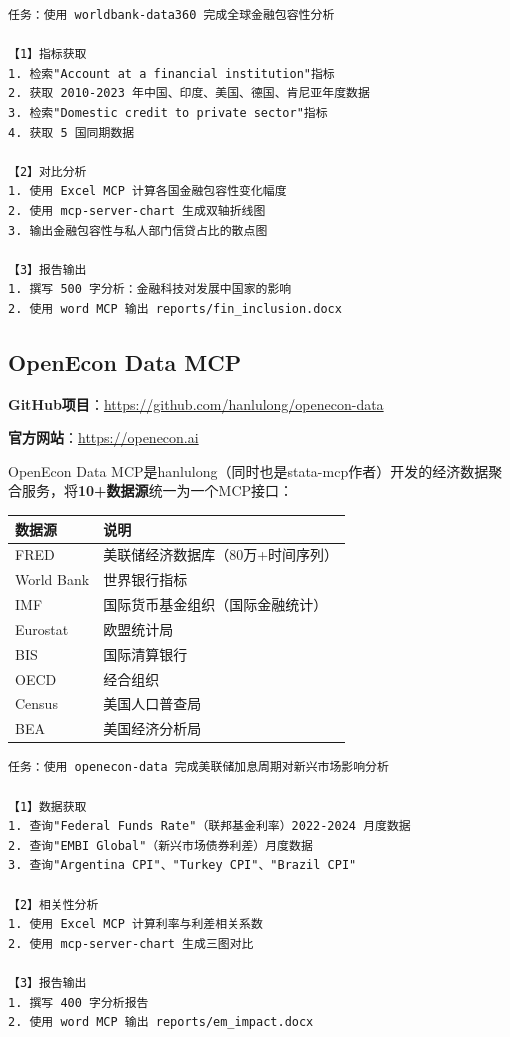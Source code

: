 \begin{lstlisting}
任务：使用 worldbank-data360 完成全球金融包容性分析

【1】指标获取
1. 检索"Account at a financial institution"指标
2. 获取 2010-2023 年中国、印度、美国、德国、肯尼亚年度数据
3. 检索"Domestic credit to private sector"指标
4. 获取 5 国同期数据

【2】对比分析
1. 使用 Excel MCP 计算各国金融包容性变化幅度
2. 使用 mcp-server-chart 生成双轴折线图
3. 输出金融包容性与私人部门信贷占比的散点图

【3】报告输出
1. 撰写 500 字分析：金融科技对发展中国家的影响
2. 使用 word MCP 输出 reports/fin_inclusion.docx
\end{lstlisting}

\subsection{OpenEcon Data MCP}

\textbf{GitHub项目}：\url{https://github.com/hanlulong/openecon-data}

\textbf{官方网站}：\url{https://openecon.ai}

OpenEcon Data MCP是hanlulong（同时也是stata-mcp作者）开发的经济数据聚合服务，将\textbf{10+数据源}统一为一个MCP接口：

\begin{table}[H]
\centering
\small
\begin{tabular}{ll}
\toprule
\textbf{数据源} & \textbf{说明} \\
\midrule
FRED & 美联储经济数据库（80万+时间序列） \\
World Bank & 世界银行指标 \\
IMF & 国际货币基金组织（国际金融统计） \\
Eurostat & 欧盟统计局 \\
BIS & 国际清算银行 \\
OECD & 经合组织 \\
Census & 美国人口普查局 \\
BEA & 美国经济分析局 \\
\bottomrule
\end{tabular}
\end{table}

\begin{lstlisting}
任务：使用 openecon-data 完成美联储加息周期对新兴市场影响分析

【1】数据获取
1. 查询"Federal Funds Rate"（联邦基金利率）2022-2024 月度数据
2. 查询"EMBI Global"（新兴市场债券利差）月度数据
3. 查询"Argentina CPI"、"Turkey CPI"、"Brazil CPI"

【2】相关性分析
1. 使用 Excel MCP 计算利率与利差相关系数
2. 使用 mcp-server-chart 生成三图对比

【3】报告输出
1. 撰写 400 字分析报告
2. 使用 word MCP 输出 reports/em_impact.docx
\end{lstlisting}

